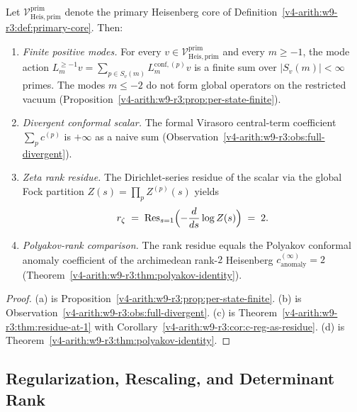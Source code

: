 \begin{theorem}
\label{v4-arith:w9-r3:thm:main}
Let \(\mathcal{V}^{\mathrm{prim}}_{\mathrm{Heis},\mathrm{prim}}\)
denote the primary Heisenberg core of
Definition~\ref{v4-arith:w9-r3:def:primary-core}. Then:
\begin{enumerate}
\item[\textnormal{(a)}] \emph{Finite positive modes.} For every
\(v\in\mathcal{V}^{\mathrm{prim}}_{\mathrm{Heis},\mathrm{prim}}\) and
every \(m\geq -1\), the mode action
\(L_{m}^{\geq -1}v=\sum_{p\in S_{v}(m)}L_{m}^{\mathrm{conf},(p)}v\)
is a finite sum over \(|S_{v}(m)|<\infty\) primes. The modes
\(m\leq -2\) do not form global operators on the restricted vacuum
(Proposition~\ref{v4-arith:w9-r3:prop:per-state-finite}).
\item[\textnormal{(b)}] \emph{Divergent conformal scalar.} The
formal Virasoro central-term coefficient
\(\sum_{p}c^{(p)}\) is \(+\infty\) as a naive sum
(Observation~\ref{v4-arith:w9-r3:obs:full-divergent}).
\item[\textnormal{(c)}] \emph{Zeta rank residue.}
The Dirichlet-series residue of the scalar via the global
Fock partition \(Z(s)=\prod_{p}Z^{(p)}(s)\) yields
\begin{equation}
\label{v4-arith:w9-r3:eq:main-result}
r_{\zeta}\;=\;\mathrm{Res}_{s=1}\Bigl(-\frac{d}{ds}\log Z(s)\Bigr)\;=\;2.
\end{equation}
\item[\textnormal{(d)}] \emph{Polyakov-rank comparison.} The rank
residue equals the Polyakov conformal anomaly coefficient of the
archimedean rank-\(2\) Heisenberg
\(c^{(\infty)}_{\mathrm{anomaly}}=2\)
(Theorem~\ref{v4-arith:w9-r3:thm:polyakov-identity}).
\end{enumerate}
\end{theorem}

\begin{proof}
(a) is Proposition~\ref{v4-arith:w9-r3:prop:per-state-finite}. (b) is
Observation~\ref{v4-arith:w9-r3:obs:full-divergent}. (c) is
Theorem~\ref{v4-arith:w9-r3:thm:residue-at-1} with
Corollary~\ref{v4-arith:w9-r3:cor:c-reg-as-residue}. (d) is
Theorem~\ref{v4-arith:w9-r3:thm:polyakov-identity}.
\end{proof}

\subsection{Regularization, Rescaling, and Determinant Rank}
\label{v4-arith:w9-r3:obstruction-analysis}

